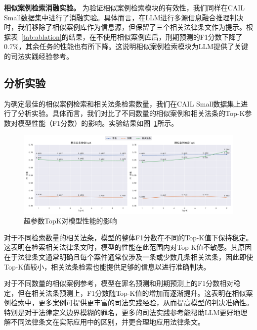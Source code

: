 \textbf{相似案例检索消融实验。}
为验证相似案例检索模块的有效性，我们同样在CAIL Small数据集中进行了消融实验。具体而言，在LLM进行多源信息融合推理判决时，我们移除了相似案例库作为信息源，但保留了三个相关法律条文作为提示。根据表~\ref{tab:ablation}的结果，在不使用相似案例库后，刑期预测的F1分数下降了0.7\%，其余任务的性能也有所下降。这说明相似案例检索模块为LLM提供了关键的司法实践经验参考。


\subsection{\heiti 分析实验}
为确定最佳的相似案例检索和相关法条检索数量，我们在CAIL Small数据集上进行了分析实验。具体而言，我们对比了不同数量的相似案例和相关法条的Top-K参数对模型性能（F1分数）的影响。实验结果如图~\ref{fig:analysis}所示。

\begin{figure}[htpb]
	\centering
	\includegraphics[width=0.8\linewidth]{fig/analysis.pdf}
	\caption{超参数TopK对模型性能的影响}
	\label{fig:analysis}
\end{figure}

对于不同检索数量的相关法条，模型的整体F1分数在不同的Top-K值下保持稳定。这表明在检索相关法律条文时，模型的性能在此范围内对Top-K值不敏感。其原因在于法律条文通常明确且每个案件通常仅涉及一条或少数几条相关法条，因此即使Top-K值较小，相关法条检索也能提供足够的信息以进行准确判决。

对于不同数量的相似案例参考，模型在罪名预测和刑期预测上的F1分数相对稳定，但在相关法条预测上，F1分数随Top-K值的增加而逐渐提升。这表明在相似案例检索中，更多案例可提供更丰富的司法实践经验，从而提高模型的判决准确性。特别是对于法律定义边界模糊的罪名，更多的司法实践参考能帮助LLM更好地理解不同法律条文在实际应用中的区别，并更合理地应用法律条文。

